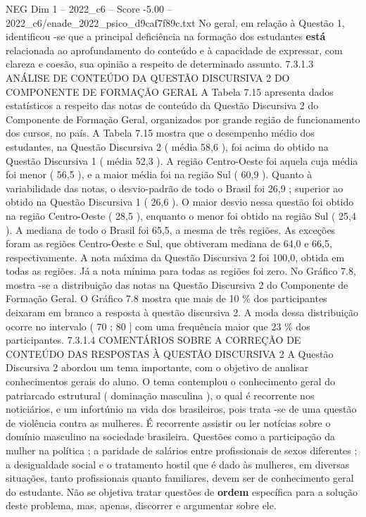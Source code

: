 \begin{textsample}{NEG Dim 1 – 2022\_c6 – Score -5.00 – 2022\_c6/enade\_2022\_psico\_d9caf7f89c.txt}
No geral, em relação à Questão 1, identificou -se que a principal deficiência na formação dos estudantes \textbf{está} relacionada ao aprofundamento do conteúdo e à capacidade de expressar, com clareza e coesão, sua opinião a respeito de determinado assunto. 7.3.1.3 ANÁLISE DE CONTEÚDO DA QUESTÃO DISCURSIVA 2 DO COMPONENTE DE FORMAÇÃO GERAL A Tabela 7.15 apresenta dados estatísticos a respeito das notas de conteúdo da Questão Discursiva 2 do Componente de Formação Geral, organizados por grande região de funcionamento dos cursos, no país.
A Tabela 7.15 mostra que o desempenho médio dos estudantes, na Questão Discursiva 2 ( média 58,6 ), foi acima do obtido na Questão Discursiva 1 ( média 52,3 ).
A região Centro-Oeste foi aquela cuja média foi menor ( 56,5 ), e a maior média foi na região Sul ( 60,9 ).
Quanto à variabilidade das notas, o desvio-padrão de todo o Brasil foi 26,9 ; superior ao obtido na Questão Discursiva 1 ( 26,6 ).
O maior desvio nessa questão foi obtido na região Centro-Oeste ( 28,5 ), enquanto o menor foi obtido na região Sul ( 25,4 ).
A mediana de todo o Brasil foi 65,5, a mesma de três regiões.
As exceções foram as regiões Centro-Oeste e Sul, que obtiveram mediana de 64,0 e 66,5, respectivamente.
A nota máxima da Questão Discursiva 2 foi 100,0, obtida em todas as regiões.
Já a nota mínima para todas as regiões foi zero.
No Gráfico 7.8, mostra -se a distribuição das notas na Questão Discursiva 2 do Componente de Formação Geral.
O Gráfico 7.8 mostra que mais de 10 \% dos participantes deixaram em branco a resposta à questão discursiva 2.
A moda dessa distribuição ocorre no intervalo ( 70 ; 80 ] com uma frequência maior que 23 \% dos participantes. 7.3.1.4 COMENTÁRIOS SOBRE A CORREÇÃO DE CONTEÚDO DAS RESPOSTAS À QUESTÃO DISCURSIVA 2 A Questão Discursiva 2 abordou um tema importante, com o objetivo de analisar conhecimentos gerais do aluno.
O tema contemplou o conhecimento geral do patriarcado estrutural ( dominação masculina ), o qual é recorrente nos noticiários, e um infortúnio na vida dos brasileiros, pois trata -se de uma questão de violência contra as mulheres.
É recorrente assistir ou ler notícias sobre o domínio masculino na sociedade brasileira.
Questões como a participação da mulher na política ; a paridade de salários entre profissionais de sexos diferentes ; a desigualdade social e o tratamento hostil que é dado às mulheres, em diversas situações, tanto profissionais quanto familiares, devem ser de conhecimento geral do estudante.
Não se objetiva tratar questões de \textbf{ordem} específica para a solução deste problema, mas, apenas, discorrer e argumentar sobre ele.

\end{textsample}
